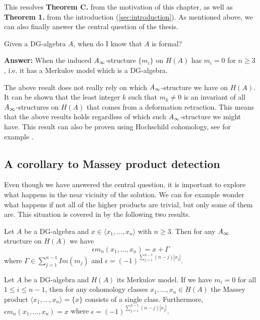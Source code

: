 This resolves \textbf{Theorem C.} from the motivation of this chapter, as well as \textbf{Theorem 1.} from the introduction (\cref{sec:introduction}). As mentioned above, we can also finally answer the central question of the thesis. 
\begin{central}
Given a DG-algebra $A$, when do I know that $A$ is formal?
\end{central}

\textbf{Answer:} When the induced $A_{\infty}$-structure $\{m_i\}$ on $H(A)$ has $m_i=0$ for $n\geq 3$, i.e. it has a Merkulov model which is a DG-algebra.  

The above result does not really rely on which $A_{\infty}$-structure we have on $H(A)$. It can be shown that the least integer $k$ such that $m_k \neq 0$ is an invariant of all $A_{\infty}$-structures on $H(A)$ that comes from a deformation retraction. This means that the above results holds regardless of which such $A_{\infty}$-structure we might have. This result can also be proven using Hochschild cohomology, see for example \cite[Theorem 3.3.]{berglund}.

\subsection*{A corollary to Massey product detection}

Even though we have answered the central question, it is important to explore what happens in the near vicinity of the solution. We can for example wonder what happens if not all of the higher products are trivial, but only some of them are. This situation is covered in \cite{detection} by the following two results.

\begin{theorem}
\label{thm:infty_massey_recovers_massey}
Let $A$ be a DG-algebra and $x\in \langle x_1, \ldots, x_n\rangle$ with $n\geq 3$. Then for any $A_{\infty}$ structure on $H(A)$ we have 
\begin{equation*}
    \epsilon m_n(x_1, \ldots, x_n) = x+\Gamma 
\end{equation*}
where $\Gamma \in \sum_{j=1}^{n-1}Im(m_j)$ and $\epsilon = (-1)^{\sum_{j=1}^{n-1} (n-j)|x_j|}$. 
\end{theorem}

\begin{corollary}
\label{cor:uniquely_defined}
Let $A$ be a DG-algebra and $H(A)$ its Merkulov model. If we have $m_i=0$ for all $1\leq i\leq n-1$, then for any cohomology classes $x_1, \ldots, x_n \in H(A)$ the Massey product $\langle x_1, \ldots, x_n\rangle = \{ x\}$ consists of a single class. Furthermore, $\epsilon m_n(x_1, \ldots, x_n)=x$ where $\epsilon = (-1)^{\sum_{j=1}^{n-1} (n-j)|x_j|}$.
\end{corollary}


